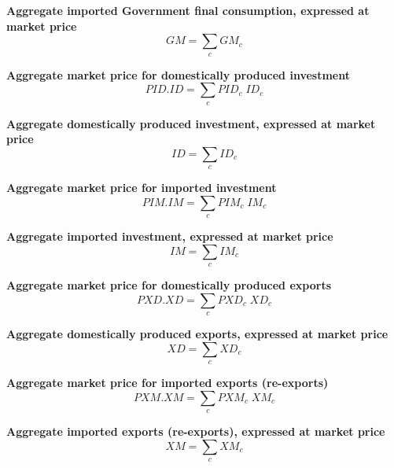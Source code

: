 \documentclass[12pt]{article}
\numberwithin{equation}{section}
\begin{document}
\noindent\textbf{Aggregate imported Government final consumption, expressed at market price} \\
\begin{dmath}
GM = \sum_{c} GM_{c}
\end{dmath}

\noindent\textbf{Aggregate market price for domestically produced investment} \\
\begin{dmath}
PID . ID = \sum_{c} PID_{c} \; ID_{c}
\end{dmath}

\noindent\textbf{Aggregate domestically produced investment, expressed at market price} \\
\begin{dmath}
ID = \sum_{c} ID_{c}
\end{dmath}

\noindent\textbf{Aggregate market price for imported investment} \\
\begin{dmath}
PIM . IM = \sum_{c} PIM_{c} \; IM_{c}
\end{dmath}

\noindent\textbf{Aggregate imported investment, expressed at market price} \\
\begin{dmath}
IM = \sum_{c} IM_{c}
\end{dmath}

\noindent\textbf{Aggregate market price for domestically produced exports} \\
\begin{dmath}
PXD . XD = \sum_{c} PXD_{c} \; XD_{c}
\end{dmath}

\noindent\textbf{Aggregate domestically produced exports, expressed at market price} \\
\begin{dmath}
XD = \sum_{c} XD_{c}
\end{dmath}

\noindent\textbf{Aggregate market price for imported exports (re-exports)} \\
\begin{dmath}
PXM . XM = \sum_{c} PXM_{c} \; XM_{c}
\end{dmath}

\noindent\textbf{Aggregate imported exports (re-exports), expressed at market price} \\
\begin{dmath}
XM = \sum_{c} XM_{c}
\end{dmath}
\end{document}
